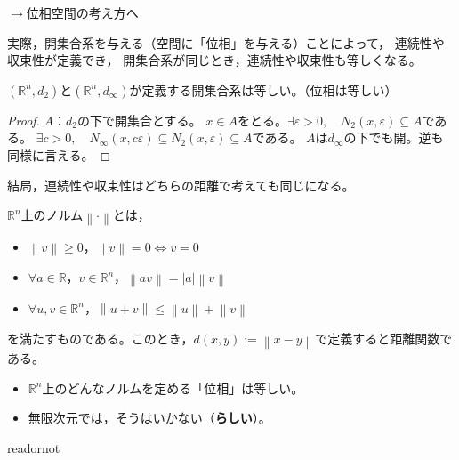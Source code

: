 \documentclass[uplatex]{jsarticle}
\begin{document}
$\longrightarrow$位相空間の考え方へ

実際，開集合系を与える（空間に「位相」を与える）ことによって，
連続性や収束性が定義でき，
開集合系が同じとき，連続性や収束性も等しくなる。

\begin{rei}
    $(\mathbb{R}^{n},d_{2})$と$(\mathbb{R}^{n},d_{\infty})$が定義する開集合系は等しい。（位相は等しい）
    \begin{proof}
        $A$：$d_{2}$の下で開集合とする。
        $x \in A$をとる。$\exists \varepsilon > 0, \quad N_{2}(x,\varepsilon) \subseteq A$である。
        $\exists c > 0, \quad N_{\infty} (x, c \varepsilon) \subseteq N_{2} (x, \varepsilon) \subseteq A$である。
        $A$は$d_{\infty}$の下でも開。逆も同様に言える。 
    \end{proof}
    結局，連続性や収束性はどちらの距離で考えても同じになる。
\end{rei}

\begin{rei}
    $\mathbb{R}^{n}$上のノルム$\left\| \cdot \right\|$とは，
    \begin{itemize}
        \vspace{-0.5\baselineskip}
        \item $\left\| v \right\| \ge 0$，\qquad $\left\| v \right\| = 0 \Longleftrightarrow v = 0$
        \item $\forall a \in \mathbb{R}$，$v \in \mathbb{R}^{n}$，$\left\| av \right\| = \left| a \right| \left\| v \right\|$
        \item $\forall u,v \in \mathbb{R}^{n}$，$\left\| u + v \right\| \le \left\| u \right\| + \left\| v \right\|$
        \vspace{-0.5\baselineskip}
    \end{itemize}
    を満たすものである。このとき，$d(x,y) := \left\| x - y \right\|$で定義すると距離関数である。
\end{rei}


\begin{itemize}
    \vspace{-0.5\baselineskip}
    \item $\mathbb{R}^{n}$上のどんなノルムを定める「位相」は等しい。
    \item 無限次元では，そうはいかない（{\bf らしい}）。
\end{itemize}

\expandafter\ifx\csname readornot\endcsname\relax
  
\end{document}
